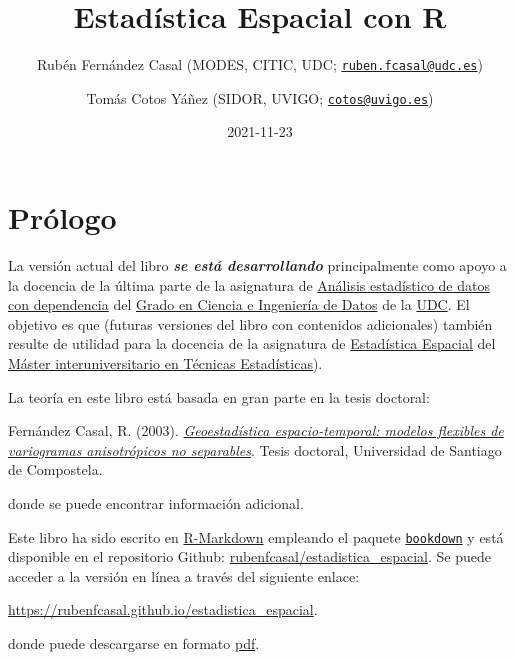 \documentclass[
  spanish,
]{book}
\title{Estadística Espacial con R}
\author{Rubén Fernández Casal (MODES, CITIC, UDC; \href{mailto:ruben.fcasal@udc.es}{\nolinkurl{ruben.fcasal@udc.es}}) \and Tomás Cotos Yáñez (SIDOR, UVIGO; \href{mailto:cotos@uvigo.es}{\nolinkurl{cotos@uvigo.es}})}
\date{2021-11-23}
\theoremstyle{break}
\begin{document}
\maketitle

{
\setcounter{tocdepth}{1}
\tableofcontents
}
\hypertarget{pruxf3logo}{%
\chapter*{Prólogo}\label{pruxf3logo}}

La versión actual del libro \textbf{\emph{se está desarrollando}} principalmente como apoyo a la docencia de la última parte de la asignatura de \href{https://guiadocente.udc.es/guia_docent/index.php?centre=614\&ensenyament=614G02\&assignatura=614G02022\&idioma=cast}{Análisis estadístico de datos con dependencia} del \href{https://estudos.udc.es/es/study/start/614G02V01}{Grado en Ciencia e Ingeniería de Datos} de la \href{https://www.udc.es}{UDC}.
El objetivo es que (futuras versiones del libro con contenidos adicionales) también resulte de utilidad para la docencia de la asignatura de \href{http://eamo.usc.es/pub/mte/index.php?option=com_content\&view=article\&id=2202\&idm=15\&a\%C3\%B1o=2021}{Estadística Espacial} del \href{http://eio.usc.es/pub/mte}{Máster interuniversitario en Técnicas Estadísticas}).

La teoría en este libro está basada en gran parte en la tesis doctoral:

Fernández Casal, R. (2003). \href{https://rubenfcasal.github.io/files/Geoestadistica_espacio-temporal.pdf}{\emph{Geoestadística espacio-temporal: modelos flexibles de variogramas anisotrópicos no separables}}. Tesis doctoral, Universidad de Santiago de Compostela.

donde se puede encontrar información adicional.

Este libro ha sido escrito en \href{http://rmarkdown.rstudio.com}{R-Markdown} empleando el paquete \href{https://bookdown.org/yihui/bookdown/}{\texttt{bookdown}} y está disponible en el repositorio Github: \href{https://github.com/rubenfcasal/estadistica_espacial}{rubenfcasal/estadistica\_espacial}.
Se puede acceder a la versión en línea a través del siguiente enlace:

\url{https://rubenfcasal.github.io/estadistica_espacial}.

donde puede descargarse en formato \href{https://rubenfcasal.github.io/estadistica_espacial/estadistica_espacial.pdf}{pdf}.
\end{document}
